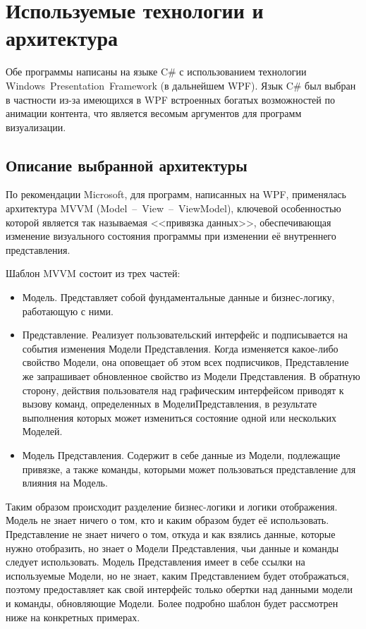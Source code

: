\section{Используемые технологии и архитектура}
Обе программы написаны на языке C\# с использованием технологии Windows~Presentation~Framework (в дальнейшем WPF).
Язык C\# был выбран в частности из-за имеющихся в WPF встроенных богатых возможностей по анимации контента, что является весомым аргументов для программ визуализации.

\subsection{Описание выбранной архитектуры}
По рекомендации Microsoft, для программ, написанных на WPF, применялась архитектура MVVM (Model~--~View~--~ViewModel), ключевой особенностью которой является так называемая <<привязка данных>>, обеспечивающая изменение визуального состояния программы при изменении её внутреннего представления.

Шаблон MVVM состоит из трех частей:
\begin{itemize}
  \item Модель. Представляет собой фундаментальные данные и бизнес-логику, работающую с ними.
  \item Представление. Реализует пользовательский интерфейс и подписывается на события изменения Модели Представления. Когда изменяется какое-либо свойство Модели, она оповещает об этом всех подписчиков, Представление же запрашивает обновленное свойство из Модели Представления. В обратную сторону, действия пользователя над графическим интерфейсом приводят к вызову команд, определенных в МоделиПредставления, в результате выполнения которых может измениться состояние одной или нескольких Моделей.
  \item Модель Представления. Содержит в себе данные из Модели, подлежащие привязке, а также команды, которыми может пользоваться представление для влияния на Модель.
\end{itemize}

Таким образом происходит разделение бизнес-логики и логики отображения. Модель не знает ничего о том, кто и каким образом будет её использовать. Представление не знает ничего о том, откуда и как взялись данные, которые нужно отобразить, но знает о Модели Представления, чьи данные и команды следует использовать. Модель Представления имеет в себе ссылки на используемые Модели, но не знает, каким Представлением будет отображаться, поэтому предоставляет как свой интерфейс только обертки над данными модели и команды, обновляющие Модели. Более подробно шаблон будет рассмотрен ниже на конкретных примерах.

